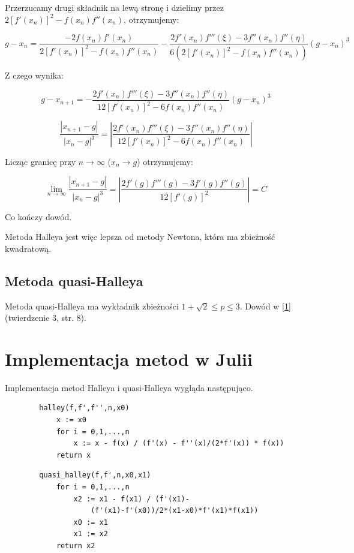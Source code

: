 \documentclass[11pt,a4paper]{article}
\begin{document}
    Przerzucamy drugi składnik na lewą stronę i dzielimy przez\\ $2[f'(x_n)]^2 - f(x_n)f''(x_n)$, otrzymujemy:

    $$
        g - x_n = \frac{-2f(x_n)f'(x_n)}{2[f'(x_n)]^2-f(x_n)f''(x_n)} - \frac{2f'(x_n)f'''(\xi)-3f''(x_n)f''(\eta)}{6(2[f'(x_n)]^2 - f(x_n)f''(x_n))}(g-x_n)^3
    $$

    Z czego wynika:

    $$
        g - x_{n+1} = - \frac{2f'(x_n)f'''(\xi)-3f''(x_n)f''(\eta)}{12[f'(x_n)]^2-6f(x_n)f''(x_n)}(g-x_n)^3
    $$

    $$
        \frac{|x_{n+1} - g|}{|x_n-g|^3} =  \left|\frac{2f'(x_n)f'''(\xi)-3f''(x_n)f''(\eta)}{12[f'(x_n)]^2-6f(x_n)f''(x_n)}\right|
    $$

    Licząc granicę przy $n \to \infty$ ($x_n \to g$) otrzymujemy:

    $$
        \lim_{n \to \infty} \frac{|x_{n+1} - g|}{|x_n-g|^3} = \left|\frac{2f'(g)f'''(g)-3f'(g)f''(g)}{12[f'(g)]^2} \right| = C
    $$

    Co kończy dowód.

    Metoda Halleya jest więc lepsza od metody Newtona, która ma zbieżność kwadratową.

    \subsection{Metoda quasi-Halleya}
    Metoda quasi-Halleya ma wykładnik zbieżności $1+\sqrt{2} \leq p \leq 3$. Dowód w \href{http://benisrael.net/HALLEY-AMS.pdf}{[1]} (twierdzenie 3, str. 8).

    \section{Implementacja metod w Julii}

    Implementacja metod Halleya i quasi-Halleya wygląda następująco.


    \begin{verbatim}
        halley(f,f',f'',n,x0)
            x := x0
            for i = 0,1,...,n
                x := x - f(x) / (f'(x) - f''(x)/(2*f'(x)) * f(x))
            return x
    \end{verbatim}

    \begin{verbatim}
        quasi_halley(f,f',n,x0,x1)
            for i = 0,1,...,n
                x2 := x1 - f(x1) / (f'(x1)-
                    (f'(x1)-f'(x0))/2*(x1-x0)*f'(x1)*f(x1))
                x0 := x1
                x1 := x2
            return x2
    \end{verbatim}
\end{document}
